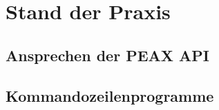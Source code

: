 \section{Stand der Praxis}

\subsection{Ansprechen der PEAX API}

\subsection{Kommandozeilenprogramme}
